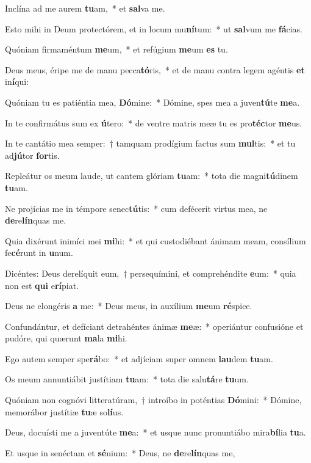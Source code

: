 \item Inclína ad me aurem \textbf{tu}am,~* et \textbf{sal}va me.
\item Esto mihi in Deum protectórem, et in locum mu\textbf{ní}tum:~* ut \textbf{sal}vum me \textbf{fá}cias.
\item Quóniam firmaméntum \textbf{me}um,~* et refúgium \textbf{me}um \textbf{es} tu.
\item Deus meus, éripe me de manu pecca\textbf{tó}ris,~* et de manu contra legem agéntis \textbf{et} in\textbf{í}qui:
\item Quóniam tu es patiéntia mea, \textbf{Dó}mine:~* Dómine, spes mea a juven\textbf{tú}te \textbf{me}a.
\item In te confirmátus sum ex \textbf{ú}tero:~* de ventre matris meæ tu es pro\textbf{téc}tor \textbf{me}us.
\item In te cantátio mea semper:~† tamquam prodígium factus sum \textbf{mul}tis:~* et tu ad\textbf{jú}tor \textbf{for}tis.
\item Repleátur os meum laude, ut cantem glóriam \textbf{tu}am:~* tota die magni\textbf{tú}dinem \textbf{tu}am.
\item Ne projícias me in témpore senec\textbf{tú}tis:~* cum defécerit virtus mea, ne \textbf{de}re\textbf{lín}quas me.
\item Quia dixérunt inimíci mei \textbf{mi}hi:~* et qui custodiébant ánimam meam, consílium fe\textbf{cé}runt in \textbf{u}num.
\item Dicéntes: Deus derelíquit eum,~† persequímini, et comprehéndite \textbf{e}um:~* quia non est \textbf{qui} e\textbf{rí}piat.
\item Deus ne elongéris \textbf{a} me:~* Deus meus, in auxílium \textbf{me}um \textbf{ré}spice.
\item Confundántur, et defíciant detrahéntes ánimæ \textbf{me}æ:~* operiántur confusióne et pudóre, qui quærunt \textbf{ma}la \textbf{mi}hi.
\item Ego autem semper spe\textbf{rá}bo:~* et adjíciam super omnem \textbf{lau}dem \textbf{tu}am.
\item Os meum annuntiábit justítiam \textbf{tu}am:~* tota die salu\textbf{tá}re \textbf{tu}um.
\item Quóniam non cognóvi litteratúram,~† introíbo in poténtias \textbf{Dó}mini:~* Dómine, memorábor justítiæ \textbf{tu}æ so\textbf{lí}us.
\item Deus, docuísti me a juventúte \textbf{me}a:~* et usque nunc pronuntiábo mira\textbf{bí}lia \textbf{tu}a.
\item Et usque in senéctam et \textbf{sé}nium:~* Deus, ne \textbf{de}re\textbf{lín}quas me,
